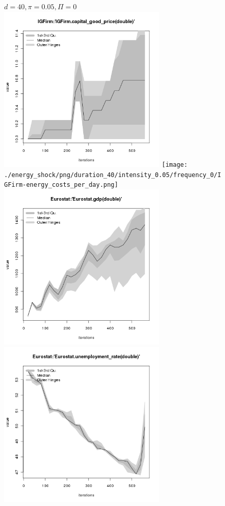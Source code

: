 \begin{figure}[ht!]
\centering\leavevmode
\begin{minipage}{17cm}
\centering\leavevmode
{$d=40, \pi=0.05, \Pi=0$}\\
\includegraphics[width=8cm]{./energy_shock/png/duration_40/intensity_0.05/frequency_0/IGFirm-capital_good_price.png}
\texttt{[image: ./energy\_shock/png/duration\_40/intensity\_0.05/frequency\_0/IGFirm-energy\_costs\_per\_day.png]}
\includegraphics[width=8cm]{./energy_shock/png/duration_40/intensity_0.05/frequency_0/Eurostat-gdp.png}
\includegraphics[width=8cm]{./energy_shock/png/duration_40/intensity_0.05/frequency_0/Eurostat-unemployment_rate.png}
\end{minipage}
\end{figure}

